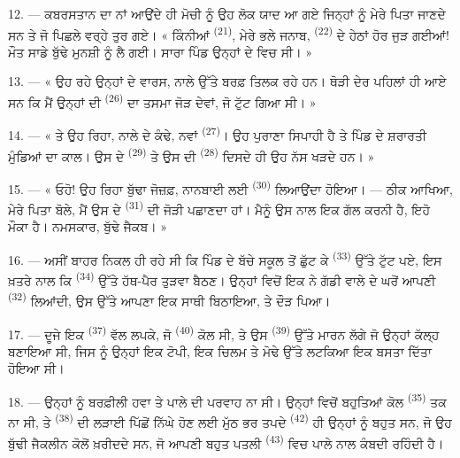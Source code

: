 12. --- ਕਬਰਸਤਾਨ ਦਾ ਨਾਂ ਆਉਂਦੇ ਹੀ ਮੋਚੀ ਨੂੰ ਉਹ ਲੋਕ ਯਾਦ ਆ ਗਏ ਜਿਨ੍ਹਾਂ ਨੂੰ ਮੇਰੇ ਪਿਤਾ
ਜਾਣਦੇ ਸਨ ਤੇ ਜੋ ਪਿਛਲੇ ਵਰ੍ਹੇ ਤੁਰ ਗਏ। « ਕਿੰਨੀਆਂ 
\textsuperscript{(21)}, ਮੇਰੇ ਭਲੇ ਜਨਾਬ,  \textsuperscript{(22)} ਦੇ ਹੇਠਾਂ
ਹੋਰ ਜੁੜ ਗਈਆਂ! ਮੌਤ ਸਾਡੇ ਬੁੱਢੇ ਮੁਨਸ਼ੀ ਨੂੰ ਲੈ ਗਈ। ਸਾਰਾ ਪਿੰਡ ਉਨ੍ਹਾਂ ਦੇ
 ਵਿਚ ਸੀ। »

13. --- « ਉਹ ਰਹੇ ਉਨ੍ਹਾਂ ਦੇ ਵਾਰਸ, ਨਾਲੇ ਉੱਤੇ ਬਰਫ਼ ਤਿਲਕ ਰਹੇ ਹਨ। ਥੋੜੀ ਦੇਰ ਪਹਿਲਾਂ ਹੀ
ਆਏ ਸਨ ਕਿ ਮੈਂ ਉਨ੍ਹਾਂ ਦੀ  \textsuperscript{(26)} ਦਾ ਤਸਮਾ ਜੋੜ
ਦੇਵਾਂ, ਜੋ ਟੁੱਟ ਗਿਆ ਸੀ। »

14. --- « ਤੇ ਉਹ ਰਿਹਾ, ਨਾਲੇ ਦੇ ਕੰਢੇ, ਨਵਾਂ 
\textsuperscript{(27)}। ਉਹ ਪੁਰਾਣਾ ਸਿਪਾਹੀ ਹੈ ਤੇ ਪਿੰਡ ਦੇ ਸ਼ਰਾਰਤੀ ਮੁੰਡਿਆਂ ਦਾ ਕਾਲ। ਉਸ
ਦੇ  \textsuperscript{(29)} ਤੇ ਉਸ ਦੀ 
\textsuperscript{(28)} ਦਿਸਦੇ ਹੀ ਉਹ ਨੱਸ ਖੜਦੇ ਹਨ। »

15. --- « ਓਹੋ! ਉਹ ਰਿਹਾ ਬੁੱਢਾ ਜੋਜ਼ਫ਼, ਨਾਨਬਾਈ ਲਈ  \textsuperscript{(30)} ਲਿਆਉਂਦਾ ਹੋਇਆ। --- ਠੀਕ ਆਖਿਆ, ਮੇਰੇ ਪਿਤਾ ਬੋਲੇ, ਮੈਂ ਉਸ
ਦੇ  \textsuperscript{(31)} ਦੀ ਜੋੜੀ ਪਛਾਣਦਾ ਹਾਂ। ਮੈਨੂੰ ਉਸ ਨਾਲ ਇਕ ਗੱਲ
ਕਰਨੀ ਹੈ, ਇਹੋ ਮੌਕਾ ਹੈ। ਨਮਸਕਾਰ, ਬੁੱਢੇ ਜੈਕਬ। »

16. --- ਅਸੀਂ ਬਾਹਰ ਨਿਕਲ ਹੀ ਰਹੇ ਸੀ ਕਿ ਪਿੰਡ ਦੇ ਬੱਚੇ ਸਕੂਲ ਤੋਂ ਛੁੱਟ ਕੇ
 \textsuperscript{(33)} ਉੱਤੇ ਟੁੱਟ ਪਏ, ਇਸ ਖ਼ਤਰੇ ਨਾਲ ਕਿ
 \textsuperscript{(34)} ਉੱਤੇ ਹੱਥ-ਪੈਰ ਤੁੜਵਾ ਬੈਠਣ। ਉਨ੍ਹਾਂ ਵਿਚੋਂ ਇਕ ਨੇ
ਗੱਡੀ ਵਾਲੇ ਦੇ ਘਰੋਂ ਆਪਣੀ  \textsuperscript{(32)} ਲਿਆਂਦੀ, ਉਸ ਉੱਤੇ ਆਪਣਾ
ਇਕ ਸਾਥੀ ਬਿਠਾਇਆ, ਤੇ ਦੌੜ ਪਿਆ।

17. --- ਦੂਜੇ ਇਕ  \textsuperscript{(37)} ਵੱਲ ਲਪਕੇ, ਜੋ
 \textsuperscript{(40)} ਕੋਲ ਸੀ, ਤੇ ਉਸ 
\textsuperscript{(39)} ਉੱਤੇ ਮਾਰਨ ਲੱਗੇ ਜੋ ਉਨ੍ਹਾਂ ਕੱਲ੍ਹ ਬਣਾਇਆ ਸੀ, ਜਿਸ ਨੂੰ ਉਨ੍ਹਾਂ ਇਕ
ਟੋਪੀ, ਇਕ ਚਿਲਮ ਤੇ ਮੋਢੇ ਉੱਤੇ ਲਟਕਿਆ ਇਕ ਬਸਤਾ ਦਿੱਤਾ ਹੋਇਆ ਸੀ।

18. --- ਉਨ੍ਹਾਂ ਨੂੰ ਬਰਫ਼ੀਲੀ ਹਵਾ ਤੇ ਪਾਲੇ ਦੀ ਪਰਵਾਹ ਨਾ ਸੀ। ਉਨ੍ਹਾਂ ਵਿਚੋਂ ਬਹੁਤਿਆਂ ਕੋਲ
 \textsuperscript{(35)} ਤਕ ਨਾ ਸੀ, ਤੇ 
\textsuperscript{(38)} ਦੀ ਲੜਾਈ ਪਿੱਛੋਂ ਨਿੱਘੇ ਹੋਣ ਲਈ ਮੁੱਠ ਭਰ ਤਪਦੇ
 \textsuperscript{(42)} ਹੀ ਉਨ੍ਹਾਂ ਨੂੰ ਬਹੁਤ ਸਨ, ਜੋ ਉਹ ਬੁੱਢੀ ਜੈਕਲੀਨ
 ਕੋਲੋਂ ਖ਼ਰੀਦਦੇ ਸਨ, ਜੋ ਆਪਣੀ ਬਹੁਤ ਪਤਲੀ 
\textsuperscript{(43)} ਵਿਚ ਪਾਲੇ ਨਾਲ ਕੰਬਦੀ ਰਹਿੰਦੀ ਹੈ।

\VUsaut{3.0mm}
\VUsaut{3.0mm}

